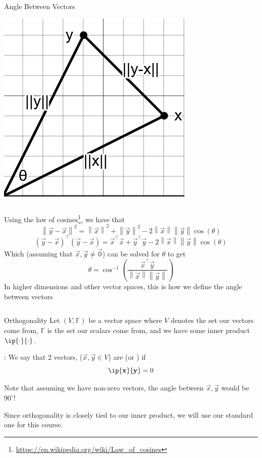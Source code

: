 \documentclass[xcoler=dvipsnames, aspectratio=169]{beamer}
\newcommand{\F}{\mathbb{F}}
\renewcommand{\norm}[1]{\left\|#1\right\|}
\begin{document}
    \begin{frame}{Angle Between Vectors}
        \small
        \begin{center}
            \includegraphics[width=.15\textwidth]{images/lawOfCosines2.png}
        \end{center}
        \pause
        \begin{columns}
            Using the law of cosines\footnote{\url{https://en.wikipedia.org/wiki/Law\_of\_cosines}},
            we have that 
            \[
                \norm{\vec{y}-\vec{x}}^2 = \norm{\vec{x}}^2 + \norm{\vec{y}}^2 
                -2\norm{\vec{x}}\norm{\vec{y}}\cos(\theta)
            \]\pause
            \vspace{-10pt}
            \[
                (\vec{y}-\vec{x})^\top(\vec{y} - \vec{x}) = \vec{x}^\top\vec{x} + \vec{y}^\top\vec{y}
                - 2\norm{\vec{x}}\norm{\vec{y}}\cos(\theta)
            \]\pause
            Which (assuming that $\vec{x},\vec{y}\neq\vec{0}$) can be solved for $\theta$ to get
            \[
                \theta = \cos^{-1}\left(\frac{\vec{x}^\top\vec{y}}{\norm{\vec{x}}\norm{\vec{y}}}\right)
            \]\pause
            In higher dimensions and other vector spaces, this is how we define the angle between vectors
        \end{columns}
    \end{frame}
    \begin{frame}{Orthogonality}
        Let $(V,\F)$ be a vector space where $V$ denotes the set our vectors come from, $\F$ is the
        set our scalars come from, and we have some inner product $\ip{\cdot}{\cdot}$.
        \begin{defn}
            : We say that 2 vectors, 
            ($\vec{x},\vec{y}\in V$) are  (or ) if
            \[
                \ip{\vec{x}}{\vec{y}} = 0
            \]\pause
        \end{defn}
        Note that assuming we have non-zero vectors, the angle between $\vec{x},\vec{y}$ 
        would be $90^\circ$!\pause
        \begin{tcolorbox}
            Since orthogonality is closely tied to our inner product, we will use our standard one
            for this course.
        \end{tcolorbox}
    \end{frame}
\end{document}

